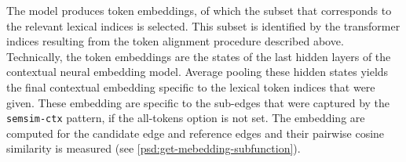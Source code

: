 \documentclass[11pt]{scrreprt}
\begin{document}
{The model produces token embeddings, of which the subset that corresponds to the relevant lexical indices is selected. This subset is identified by the transformer indices resulting from the token alignment procedure described above. Technically, the token embeddings are the states of the last hidden layers of the contextual neural embedding model. Average pooling these hidden states yields the final contextual embedding specific to the lexical token indices that were given. These embedding are specific to the sub-edges that were captured by the \texttt{semsim-ctx} pattern, if the all-tokens option is not set. The embedding are computed for the candidate edge and reference edges and their pairwise cosine similarity is measured (see \cref{psd:get-mebedding-subfunction}).





%
%
%
%
%
%
%


}
\end{document}

